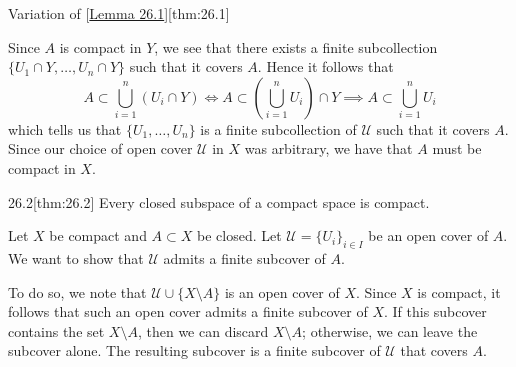 \begin{thmBox}{Variation of [\hyperlink{lem:26.1}{Lemma 26.1}]}[thm:26.1]
\begin{proofBox}
        Since \( A \) is compact in \( Y \), we see that there exists a finite 
        subcollection \( \{ U_{ 1 } \cap Y , \ldots , U_{ n } \cap Y \} \) such that 
        it covers \( A \).
        Hence it follows that 
        \begin{equation*}
            A \subset \bigcup_{ i = 1 }^{ n } ( U_{ i } \cap Y )
            \iff 
            A \subset \left( \bigcup_{ i = 1 }^{ n } U_{ i } \right) \cap Y
            \implies 
            A \subset \bigcup_{ i = 1 }^{ n } U_{ i } 
        \end{equation*}
        which tells us that \( \{ U_{ 1 } , \ldots , U_{ n } \} \) is a finite 
        subcollection of \( \mathcal{U} \) such that it covers \( A \).
        Since our choice of open cover \( \mathcal{U} \) in \( X \) was arbitrary,
        we have that \( A \) must be compact in \( X \).
    \end{proofBox}
\end{thmBox}

\begin{thmBox}{26.2}[thm:26.2]
    Every closed subspace of a compact space is compact.

    \baseRule

    \begin{proofBox}
        Let \( X \) be compact and \( A \subset X \) be closed.
        Let \( \mathcal{U} = \{ U_{ i } \}_{ i \in I } \) be an open cover of 
        \( A \).
        We want to show that \( \mathcal{U} \) admits a finite subcover of 
        \( A \).

        \baseSkip

        To do so, we note that \( \mathcal{U} \cup \{ X \setminus A \} \) is an 
        open cover of \( X \).
        Since \( X \) is compact, it follows that such an open cover admits a 
        finite subcover of \( X \).
        If this subcover contains the set \( X \setminus A \), then we can 
        discard \( X \setminus A \); otherwise, we can leave the subcover alone.
        The resulting subcover is a finite subcover of \( \mathcal{U} \) that
        covers \( A \).
    \end{proofBox}
\end{thmBox}

